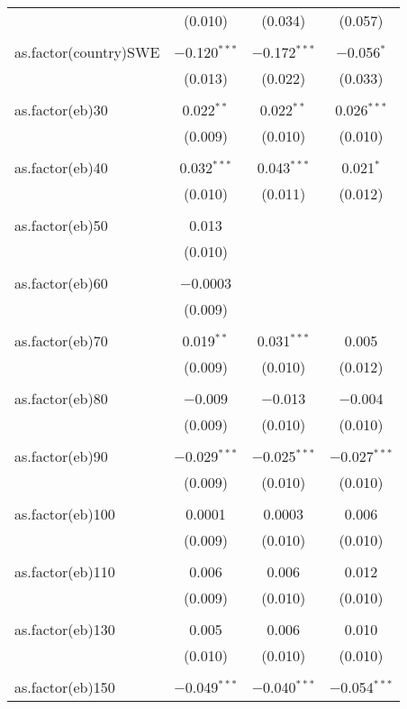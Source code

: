 \begin{table}[!htbp]
\begin{tabular}{@{\extracolsep{5pt}}lccc}
  & (0.010) & (0.034) & (0.057) \\ 
  & & & \\ 
 as.factor(country)SWE & $-$0.120$^{***}$ & $-$0.172$^{***}$ & $-$0.056$^{*}$ \\ 
  & (0.013) & (0.022) & (0.033) \\ 
  & & & \\ 
 as.factor(eb)30 & 0.022$^{**}$ & 0.022$^{**}$ & 0.026$^{***}$ \\ 
  & (0.009) & (0.010) & (0.010) \\ 
  & & & \\ 
 as.factor(eb)40 & 0.032$^{***}$ & 0.043$^{***}$ & 0.021$^{*}$ \\ 
  & (0.010) & (0.011) & (0.012) \\ 
  & & & \\ 
 as.factor(eb)50 & 0.013 &  &  \\ 
  & (0.010) &  &  \\ 
  & & & \\ 
 as.factor(eb)60 & $-$0.0003 &  &  \\ 
  & (0.009) &  &  \\ 
  & & & \\ 
 as.factor(eb)70 & 0.019$^{**}$ & 0.031$^{***}$ & 0.005 \\ 
  & (0.009) & (0.010) & (0.012) \\ 
  & & & \\ 
 as.factor(eb)80 & $-$0.009 & $-$0.013 & $-$0.004 \\ 
  & (0.009) & (0.010) & (0.010) \\ 
  & & & \\ 
 as.factor(eb)90 & $-$0.029$^{***}$ & $-$0.025$^{***}$ & $-$0.027$^{***}$ \\ 
  & (0.009) & (0.010) & (0.010) \\ 
  & & & \\ 
 as.factor(eb)100 & 0.0001 & 0.0003 & 0.006 \\ 
  & (0.009) & (0.010) & (0.010) \\ 
  & & & \\ 
 as.factor(eb)110 & 0.006 & 0.006 & 0.012 \\ 
  & (0.009) & (0.010) & (0.010) \\ 
  & & & \\ 
 as.factor(eb)130 & 0.005 & 0.006 & 0.010 \\ 
  & (0.010) & (0.010) & (0.010) \\ 
  & & & \\ 
 as.factor(eb)150 & $-$0.049$^{***}$ & $-$0.040$^{***}$ & $-$0.054$^{***}$ \\ 

\end{tabular}
\end{table}
